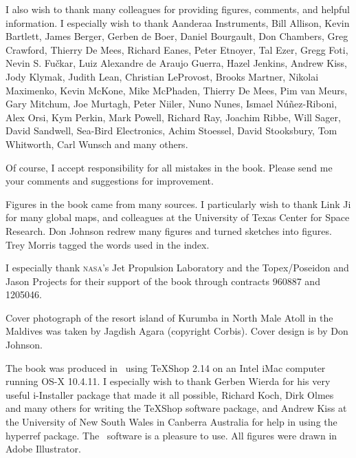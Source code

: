 I also wish to thank many colleagues for providing figures, comments,
and helpful information. I especially wish to thank Aanderaa
Instruments, Bill Allison, Kevin Bartlett, James Berger, Gerben de
Boer, Daniel Bourgault, Don Chambers, Greg Crawford, Thierry De Mees,
Richard Eanes, Peter Etnoyer, Tal Ezer, Gregg Foti, Nevin
S. Fu\v{c}kar, Luiz Alexandre de Araujo Guerra, Hazel Jenkins, Andrew
Kiss, Jody Klymak, Judith Lean, Christian LeProvost, Brooks Martner,
Nikolai Maximenko, Kevin McKone, Mike McPhaden, Thierry De Mees, Pim
van Meurs, Gary Mitchum, Joe Murtagh, Peter Niiler, Nuno Nunes, Ismael
N\'{u}\~{n}ez-Riboni, Alex Orsi, Kym Perkin, Mark Powell, Richard Ray,
Joachim Ribbe, Will Sager, David Sandwell, Sea-Bird Electronics, Achim
Stoessel, David Stooksbury, Tom Whitworth, Carl Wunsch and many
others.

Of course, I accept responsibility for all mistakes in the
book. Please send me your comments and suggestions for improvement.

Figures in the book came from many sources. I particularly wish to
thank Link Ji for many global maps, and colleagues at the University
of Texas Center for Space Research. Don Johnson redrew many figures
and turned sketches into figures. Trey Morris tagged the words used in
the index.

I especially thank \textsc{nasa}'s Jet Propulsion Laboratory and the
Topex/Poseidon and Jason Projects for their support of the book
through contracts 960887 and 1205046.

Cover photograph of the resort island of Kurumba in North Male Atoll
in the Maldives was taken by Jagdish Agara (copyright Corbis). Cover
design is by Don Johnson.

The book was produced in \LaTeXe\ using TeXShop 2.14 on an Intel iMac
computer running OS-X 10.4.11. I especially wish to thank Gerben
Wierda for his very useful i-Installer package that made it all
possible, Richard Koch, Dirk Olmes and many others for writing the
TeXShop software package, and Andrew Kiss at the University of New
South Wales in Canberra Australia for help in using the hyperref
package. The \LaTeXe\ software is a pleasure to use. All figures were
drawn in Adobe Illustrator.
